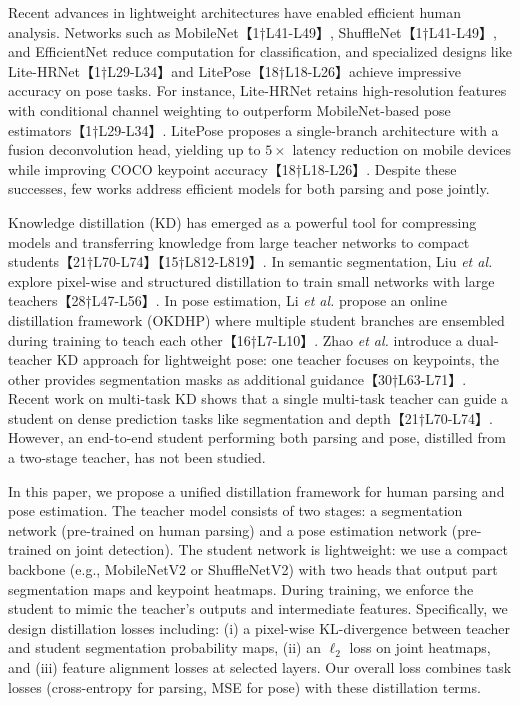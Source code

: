 \documentclass{article}
\begin{document}
Recent advances in lightweight architectures have enabled efficient human analysis. Networks such as MobileNet【1†L41-L49】, ShuffleNet【1†L41-L49】, and EfficientNet reduce computation for classification, and specialized designs like Lite-HRNet【1†L29-L34】and LitePose【18†L18-L26】achieve impressive accuracy on pose tasks. For instance, Lite-HRNet retains high-resolution features with conditional channel weighting to outperform MobileNet-based pose estimators【1†L29-L34】. LitePose proposes a single-branch architecture with a fusion deconvolution head, yielding up to $5\times$ latency reduction on mobile devices while improving COCO keypoint accuracy【18†L18-L26】. Despite these successes, few works address efficient models for both parsing and pose jointly.

Knowledge distillation (KD) has emerged as a powerful tool for compressing models and transferring knowledge from large teacher networks to compact students【21†L70-L74】【15†L812-L819】. In semantic segmentation, Liu \textit{et al.} explore pixel-wise and structured distillation to train small networks with large teachers【28†L47-L56】. In pose estimation, Li \textit{et al.} propose an online distillation framework (OKDHP) where multiple student branches are ensembled during training to teach each other【16†L7-L10】. Zhao \textit{et al.} introduce a dual-teacher KD approach for lightweight pose: one teacher focuses on keypoints, the other provides segmentation masks as additional guidance【30†L63-L71】. Recent work on multi-task KD shows that a single multi-task teacher can guide a student on dense prediction tasks like segmentation and depth【21†L70-L74】. However, an end-to-end student performing both parsing and pose, distilled from a two-stage teacher, has not been studied.

In this paper, we propose a unified distillation framework for human parsing and pose estimation. The teacher model consists of two stages: a segmentation network (pre-trained on human parsing) and a pose estimation network (pre-trained on joint detection). The student network is lightweight: we use a compact backbone (e.g., MobileNetV2 or ShuffleNetV2) with two heads that output part segmentation maps and keypoint heatmaps. During training, we enforce the student to mimic the teacher’s outputs and intermediate features. Specifically, we design distillation losses including: (i) a pixel-wise KL-divergence between teacher and student segmentation probability maps, (ii) an $\ell_2$ loss on joint heatmaps, and (iii) feature alignment losses at selected layers. Our overall loss combines task losses (cross-entropy for parsing, MSE for pose) with these distillation terms.
\end{document}
